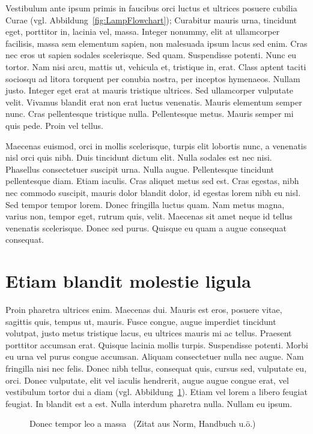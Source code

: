 Vestibulum ante ipsum primis in faucibus orci luctus et ultrices posuere cubilia Curae (vgl. Abbildung~\ref{fig:LampFlowchart}); Curabitur mauris urna, tincidunt eget, porttitor in, lacinia vel, massa. Integer nonummy, elit at ullamcorper facilisis, massa sem elementum sapien, non malesuada ipsum lacus sed enim. Cras nec eros ut sapien sodales scelerisque. Sed quam. Suspendisse potenti. Nunc eu tortor. Nam nisi arcu, mattis ut, vehicula et, tristique in, erat. Class aptent taciti sociosqu ad litora torquent per conubia nostra, per inceptos hymenaeos. Nullam justo. Integer eget erat at mauris tristique ultrices. Sed ullamcorper vulputate velit. Vivamus blandit erat non erat luctus venenatis. Mauris elementum semper nunc. Cras pellentesque tristique nulla. Pellentesque metus. Mauris semper mi quis pede. Proin vel tellus.

Maecenas euismod, orci in mollis scelerisque, turpis elit lobortis nunc, a venenatis nisl orci quis nibh. Duis tincidunt dictum elit. Nulla sodales est nec nisi. Phasellus consectetuer suscipit urna. Nulla augue. Pellentesque tincidunt pellentesque diam. Etiam iaculis. Cras aliquet metus sed est. Cras egestas, nibh nec commodo suscipit, mauris dolor blandit dolor, id egestas lorem nibh eu nisl. Sed tempor tempor lorem. Donec fringilla luctus quam. Nam metus magna, varius non, tempor eget, rutrum quis, velit. Maecenas sit amet neque id tellus venenatis scelerisque. Donec sed purus. Quisque eu quam a augue consequat consequat.

\section{Etiam blandit molestie ligula}

Proin pharetra ultrices enim. Maecenas dui. Mauris est eros, posuere vitae, sagittis quis, tempus ut, mauris. Fusce congue, augue imperdiet tincidunt volutpat, justo metus tristique lacus, eu ultrices mauris mi ac tellus. Praesent porttitor accumsan erat. Quisque lacinia mollis turpis. Suspendisse potenti. Morbi eu urna vel purus congue accumsan. Aliquam consectetuer nulla nec augue. Nam fringilla nisi nec felis. Donec nibh tellus, consequat quis, cursus sed, vulputate eu, orci. Donec vulputate, elit vel iaculis hendrerit, augue augue congue erat, vel vestibulum tortor dui a diam (vgl. Abbildung~\ref{fig:BurgerFlowchart}). Etiam vel lorem a libero feugiat feugiat. In blandit est a est. Nulla interdum pharetra nulla. Nullam eu ipsum.

\begin{figure}[htb]
  \centering
  \caption{Donec tempor leo a massa~\cite{praxisbuch2017} (Zitat aus Norm, Handbuch u.ö.)}\label{fig:BurgerFlowchart}
\end{figure}

